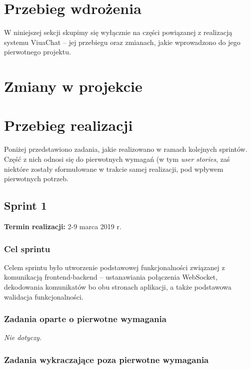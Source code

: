 \section{Przebieg wdrożenia}
W niniejszej sekcji skupimy się wyłącznie na części powiązanej z realizacją
systemu ViuaChat -- jej przebiegu oraz zmianach, jakie wprowadzono do jego
pierwotnego projektu.

\section{Zmiany w projekcie}

\section{Przebieg realizacji}
 Poniżej przedstawiono zadania, jakie realizowano w ramach kolejnych
 sprintów. Część z nich odnosi się do pierwotnych wymagań (w tym
 \textit{user stories}, zaś niektóre zostały sformułowane w trakcie samej
 realizacji, pod wpływem pierwotnych potrzeb.

 \subsection{Sprint 1}

\textbf{Termin realizacji:} 2-9 marca 2019 r.

\subsubsection{Cel sprintu}
Celem sprintu było utworzenie podstawowej funkcjonalności związanej z
komunikacją frontend-backend -- ustanawiania połączenia WebSocket,
dekodowania komunikatów bo obu stronach aplikacji, a także podstawowa
walidacja funkcjonalności.

\subsubsection{Zadania oparte o pierwotne wymagania}
\textit{Nie dotyczy.}

\subsubsection{Zadania wykraczające poza pierwotne wymagania}

